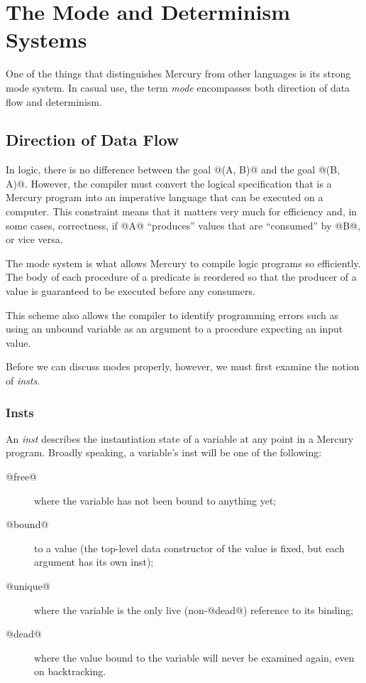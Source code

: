 \section{The Mode and Determinism Systems}

One of the things that distinguishes Mercury from other languages
is its strong mode system.  In casual use, the term \emph{mode}
encompasses both direction of data flow and determinism.

\subsection{Direction of Data Flow}

In logic, there is no difference between the goal @(A, B)@ and
the goal @(B, A)@.  However, the compiler must convert the
logical specification that is a Mercury program into an
imperative language that can be executed on a computer.  This
constraint means that it matters very much for efficiency and,
in some cases, correctness, if @A@ ``produces'' values that
are ``consumed'' by @B@, or vice versa.

The mode system is what allows Mercury to compile logic
programs so efficiently.  The body of each procedure of a
predicate is reordered so that the producer of a value is
guaranteed to be executed before any consumers.

This scheme also allows the compiler to identify programming
errors such as using an unbound variable as an argument to a
procedure expecting an input value.

Before we can discuss modes properly, however, we must first
examine the notion of \emph{insts}.

\subsubsection{Insts}

An \emph{inst} describes the instantiation state of a variable
at any point in a Mercury program.  Broadly speaking, a
variable's inst will be one of the following:
\begin{description}
\item[@free@] where the variable has not been bound to anything yet;
\item[@bound@] to a value (the top-level
  data constructor of the value is fixed, but each argument has its own
  inst);
\item[@unique@] where the variable is the only live (\ie non-@dead@)
  reference to its binding;
\item[@dead@] where the value bound to the variable will never be
  examined again, even on backtracking.
\end{description}


